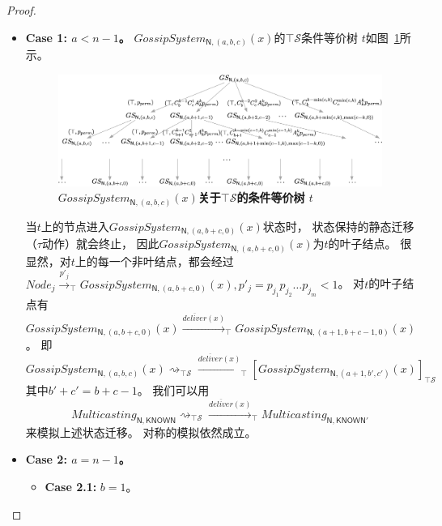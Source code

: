\begin{proof}
\begin{itemize}
{        %
        \begin{itemize}
            \item {\textbf{Case 1: $a<n-1$。}
            $GossipSystem_{\mathsf{N},(a,b,c)}(x)$的$\top \mathcal{S}$条件等价树 $t$如图~\ref{fig:epsilon_1}所示。
            \begin{figure}[!htbp]
            	\small
            	\centering
            	\includegraphics[width=14cm]{../figures/epsilon_tree1.png}
                \caption{\textbf{$GossipSystem_{\mathsf{N},(a,b,c)}(x)$关于$\top\mathcal{S}$的条件等价树 $t$}}
                \label{fig:epsilon_1}
            \end{figure}
            当$t$上的节点进入$GossipSystem_{\mathsf{N},(a,b+c,0)}(x)$状态时，
            状态保持的静态迁移（$\tau$动作）就会终止，
            因此$GossipSystem_{\mathsf{N},(a,b+c,0)}(x)$为$t$的叶子结点。
            很显然，对$t$上的每一个非叶结点，都会经过$Node_j\stackrel{p'_j}{\rightarrow}_{\top}GossipSystem_{\mathsf{N},(a,b+c,0)}(x),p'_j=p_{j_1}p_{j_2}\dots p_{j_m}<1$。
            对$t$的叶子结点有$GossipSystem_{\mathsf{N},(a,b+c,0)}(x)\stackrel{\overline{deliver}(x)}{\longrightarrow}_{\top} GossipSystem_{\mathsf{N},(a+1,b+c-1,0)}(x)$。
            即
            $$GossipSystem_{\mathsf{N},(a,b,c)}(x)\rightsquigarrow_{\top\mathcal{S}}\stackrel{\overline{deliver}(x)}{\longrightarrow}_{\top}[GossipSystem_{\mathsf{N},(a+1,b',c')}(x)]_{\top\mathcal{S}}$$
            其中$b'+c'=b+c-1$。
            我们可以用$$Multicasting_{\mathsf{N},\mathsf{KNOWN}}\rightsquigarrow_{\top\mathcal{S}}\stackrel{\overline{deliver}(x)}{\longrightarrow}_{\top} Multicasting_{\mathsf{N}, \mathsf{KNOWN}'}$$来模拟上述状态迁移。
            对称的模拟依然成立。
            }
            \item {\textbf{Case 2: $a=n-1$。}
            \begin{itemize}
               \item {
                  {\textbf{Case 2.1:} $b=1$。}
}
\end{itemize}}
\end{itemize}}
\end{itemize}
\end{proof}
